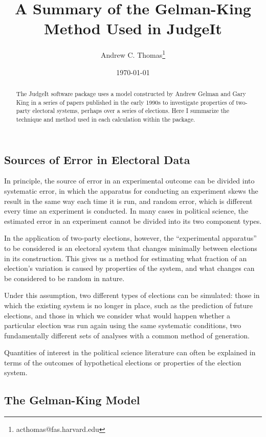 \documentclass[12pt]{article}
\title{A Summary of the Gelman-King Method Used in JudgeIt}
\author{Andrew C. Thomas\thanks{acthomas@fas.harvard.edu}}
\date{\today}
\begin{document}
\maketitle

\begin{abstract}

The JudgeIt software package uses a model constructed by Andrew Gelman and Gary King in a series of papers published in the early 1990s to investigate properties of two-party electoral systems, perhaps over a series of elections. Here I summarize the technique and method used in each calculation within the package.
\end{abstract}

\subsection*{Sources of Error in Electoral Data}
In principle, the source of error in an experimental outcome can be divided into systematic error, in which the apparatus for conducting an experiment skews the result in the same way each time it is run, and random error, which is different every time an experiment is conducted. In many cases in political science, the estimated error in an experiment cannot be divided into its two component types.

In the application of two-party elections, however, the ``experimental apparatus'' to be considered is an electoral system that changes minimally between elections in its construction. This gives us a method for estimating what fraction of an election's variation is caused by properties of the system, and what changes can be considered to be random in nature.

Under this assumption, two different types of elections can be simulated: those in which the existing system is no longer in place, such as the prediction of future elections, and those in which we consider what would happen whether a particular election was run again using the same systematic conditions, two fundamentally different sets of analyses with a common method of generation.

Quantities of interest in the political science literature can often be explained in terms of the outcomes of hypothetical elections or properties of the election system. %

\subsection*{The Gelman-King Model}
\end{document}
